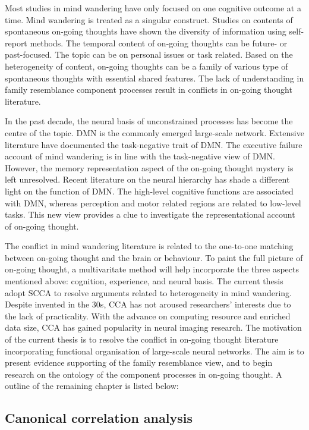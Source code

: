 Most studies in mind wandering have only focused on one cognitive outcome at a time. Mind wandering is treated as a singular construct. Studies on contents of spontaneous on-going thoughts have shown the diversity of information using self-report methods. The temporal content of on-going thoughts can be future- or past-focused. The topic can be on personal issues or task related. Based on the heterogeneity of content, on-going thoughts can be a family of various type of spontaneous thoughts with essential shared features. The lack of understanding in family resemblance component processes result in conflicts in on-going thought literature.

In the past decade, the neural basis of unconstrained processes has become the centre of the topic. DMN is the commonly emerged large-scale network. Extensive literature have documented the task-negative trait of DMN. The executive failure account of mind wandering is in line with the task-negative view of DMN. However, the memory representation aspect of the on-going thought mystery is left unresolved. Recent literature on the neural hierarchy has shade a different light on the function of DMN. The high-level cognitive functions are associated with DMN, whereas perception and motor related regions are related to low-level tasks. This new view provides a clue to investigate the representational account of on-going thought. 

The conflict in mind wandering literature is related to the one-to-one matching between on-going thought and the brain or behaviour. To paint the full picture of on-going thought, a multivaritate method will help incorporate the three aspects mentioned above: cognition, experience, and neural basis. The current thesis adopt SCCA to resolve arguments related to heterogeneity in mind wandering. Despite invented in the 30s, CCA has not aroused researchers’ interests due to the lack of practicality. With the advance on computing resource and enriched data size, CCA has gained popularity in neural imaging research. The motivation of the current thesis is to resolve the conflict in on-going thought literature incorporating functional organisation of large-scale neural networks. The aim is to present evidence supporting of the family resemblance view, and to begin research on the ontology of the component processes in on-going thought. A outline of the remaining chapter is listed below: 

\subsection*{Canonical correlation analysis}

